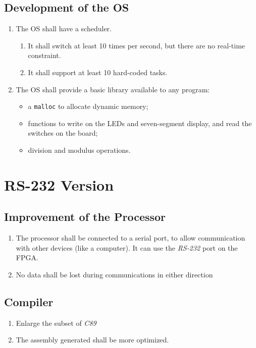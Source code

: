 \documentclass{article}
\begin{document}
      \subsection{Development of the OS}
        \begin{enumerate}
          \item The OS shall have a scheduler.
              \begin{enumerate}
                \item It shall switch at least 10 times per second, but there
                    are no real-time constraint.
                \item It shall support at least 10 hard-coded tasks.
              \end{enumerate}
          \item The OS shall provide a basic library available to any program:
            \begin{itemize}
              \item a \verb+malloc+ to allocate dynamic memory;
              \item functions to write on the LEDs and seven-segment display,
                and read the switches on the board;
              \item division and modulus operations.
             \end{itemize}
        \end{enumerate}

    \section{RS-232 Version}

      \subsection{Improvement of the Processor}
        \begin{enumerate}
          \item The processor shall be connected to a serial port, to allow
            communication with other devices (like a computer). It can use the
            \textit{RS-232} port on the FPGA.
          \item No data shall be lost during communications in either direction 
        \end{enumerate}

      \subsection{Compiler}
        \begin{enumerate}
          \item Enlarge the subset of \textit{C89}
          \item The assembly generated shall be more optimized.
        \end{enumerate}
\end{document}
